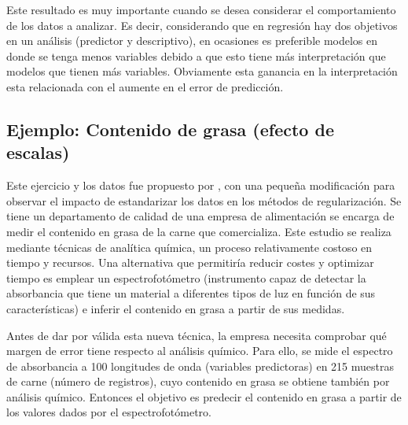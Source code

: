 \documentclass{article}
\begin{document}
Este resultado es muy importante cuando se desea considerar el comportamiento de los datos a analizar. Es decir, considerando que en regresión hay dos objetivos en un análisis (predictor y descriptivo), en ocasiones es preferible modelos en donde se tenga menos variables debido a que esto tiene más interpretación que modelos que tienen más variables. Obviamente esta ganancia en la interpretación esta relacionada con el aumente en el error de predicción. 

\subsection{Ejemplo: Contenido de grasa (efecto de escalas)}
Este ejercicio y los datos fue propuesto por \cite{Boehmke2019HandsOnML}, con una pequeña modificación para observar el impacto de estandarizar los datos en los métodos de regularización. Se tiene un departamento de calidad de una empresa de alimentación se encarga de medir el contenido en grasa de la carne que comercializa. Este estudio se realiza mediante técnicas de analítica química, un proceso relativamente costoso en tiempo y recursos. Una alternativa que permitiría reducir costes y optimizar tiempo es emplear un espectrofotómetro (instrumento capaz de detectar la absorbancia que tiene un material a diferentes tipos de luz en función de sus características) e inferir el contenido en grasa a partir de sus medidas.

Antes de dar por válida esta nueva técnica, la empresa necesita comprobar qué margen de error tiene respecto al análisis químico. Para ello, se mide el espectro de absorbancia a 100 longitudes de onda (variables predictoras) en 215 muestras de carne (número de registros), cuyo contenido en grasa se obtiene también por análisis químico. Entonces el objetivo es predecir el contenido en grasa a partir de los valores dados por el espectrofotómetro.
\end{document}
